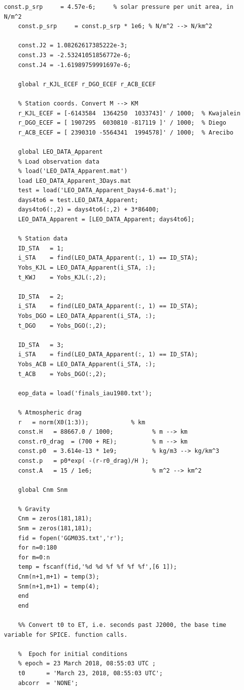 \documentclass[conf]{new-aiaa}
\begin{document}
\begin{lstlisting}[basicstyle=\footnotesize]
	const.p_srp     = 4.57e-6;     % solar pressure per unit area, in N/m^2 
	const.p_srp     = const.p_srp * 1e6; % N/m^2 --> N/km^2 
	
	const.J2 = 1.08262617385222e-3; 
	const.J3 = -2.53241051856772e-6;
	const.J4 = -1.61989759991697e-6; 
	
	global r_KJL_ECEF r_DGO_ECEF r_ACB_ECEF 
	
	% Station coords. Convert M --> KM 
	r_KJL_ECEF = [-6143584  1364250  1033743]' / 1000;  % Kwajalein 
	r_DGO_ECEF = [ 1907295  6030810 -817119 ]' / 1000;  % Diego 
	r_ACB_ECEF = [ 2390310 -5564341  1994578]' / 1000;  % Arecibo 
	
	global LEO_DATA_Apparent 
	% Load observation data 
	% load('LEO_DATA_Apparent.mat') 
	load LEO_DATA_Apparent_3Days.mat 
	test = load('LEO_DATA_Apparent_Days4-6.mat'); 
	days4to6 = test.LEO_DATA_Apparent; 
	days4to6(:,2) = days4to6(:,2) + 3*86400; 
	LEO_DATA_Apparent = [LEO_DATA_Apparent; days4to6];   
	
	% Station data 
	ID_STA   = 1; 
	i_STA    = find(LEO_DATA_Apparent(:, 1) == ID_STA); 
	Yobs_KJL = LEO_DATA_Apparent(i_STA, :); 
	t_KWJ    = Yobs_KJL(:,2); 
	
	ID_STA   = 2; 
	i_STA    = find(LEO_DATA_Apparent(:, 1) == ID_STA); 
	Yobs_DGO = LEO_DATA_Apparent(i_STA, :);
	t_DGO    = Yobs_DGO(:,2); 
	
	ID_STA   = 3; 
	i_STA    = find(LEO_DATA_Apparent(:, 1) == ID_STA); 
	Yobs_ACB = LEO_DATA_Apparent(i_STA, :);
	t_ACB    = Yobs_DGO(:,2); 
	
	eop_data = load('finals_iau1980.txt'); 
	
	% Atmospheric drag 
	r   = norm(X0(1:3));            % km 
	const.H   = 88667.0 / 1000;           % m --> km 
	const.r0_drag  = (700 + RE);          % m --> km 
	const.p0  = 3.614e-13 * 1e9;          % kg/m3 --> kg/km^3 
	const.p   = p0*exp( -(r-r0_drag)/H ); 
	const.A   = 15 / 1e6;                 % m^2 --> km^2 
	
	global Cnm Snm 
	
	% Gravity 
	Cnm = zeros(181,181);
	Snm = zeros(181,181);
	fid = fopen('GGM03S.txt','r');
	for n=0:180
	for m=0:n
	temp = fscanf(fid,'%d %d %f %f %f %f',[6 1]);        
	Cnm(n+1,m+1) = temp(3);
	Snm(n+1,m+1) = temp(4);
	end
	end
	
	%% Convert t0 to ET, i.e. seconds past J2000, the base time variable for SPICE. function calls.
	
	%  Epoch for initial conditions 
	% epoch = 23 March 2018, 08:55:03 UTC ; 
	t0      = 'March 23, 2018, 08:55:03 UTC'; 
	abcorr  = 'NONE';
	

\end{lstlisting}
\end{document}
